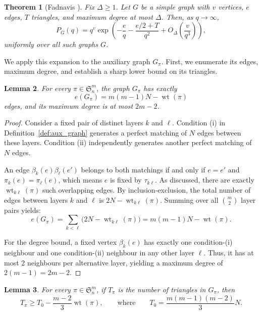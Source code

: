 \documentclass[11pt,reqno]{amsart}
\newtheorem{theorem}{Theorem}[section]
\newtheorem{lemma}[theorem]{Lemma}
\theoremstyle{definition}
\theoremstyle{remark}
\renewcommand\geq{\geqslant}
\renewcommand\to{\rightarrow}
\newcommand{\wt}{\operatorname{wt}}
\begin{document}
\begin{theorem}[Fadnavis \cite{Fadnavis}]\label{thm:fadnavis_expansion}
Fix $\Delta\geq1$. Let $G$ be a simple graph with $v$ vertices, $e$ edges, $T$ triangles, and maximum degree at most $\Delta$. Then, as $q\to\infty$,
\begin{equation}\label{eq:chromatic_formula}
        P_G(q)=q^v\exp\left( -\frac eq-\frac{e/2+T}{q^2}+O_\Delta\left(\frac v{q^3}\right) \right),
\end{equation}
uniformly over all such graphs $G$.
\end{theorem}

We apply this expansion to the auxiliary graph $G_\pi$. First, we enumerate its edges, maximum degree, and establish a sharp lower bound on its triangles.

\begin{lemma}\label{lem:aux_basic}
For every $\pi\in\mathfrak S_n^m$, the graph $G_\pi$ has exactly 
$$e(G_\pi)=m(m-1)N-\wt(\pi)$$
edges, and its maximum degree is at most $2m-2$.
\end{lemma}

\begin{proof}
Consider a fixed pair of distinct layers $k$ and $\ell$. Condition \textup{(i)} in Definition~\ref{def:aux_graph} generates a perfect matching of $N$ edges between these layers. Condition \textup{(ii)} independently generates another perfect matching of $N$ edges. 

An edge $\beta_k(e)\beta_\ell(e')$ belongs to both matchings if and only if $e=e'$ and $\pi_k(e)=\pi_\ell(e)$, which means $e$ is fixed by $\tau_{k\ell}$. As discussed, there are exactly $\wt_{k\ell}(\pi)$ such overlapping edges. By inclusion-exclusion, the total number of edges between layers $k$ and $\ell$ is $2N-\wt_{k\ell}(\pi)$. Summing over all $\binom m2$ layer pairs yields:
\[
        e(G_\pi)=\sum_{k<\ell}\bigl(2N-\wt_{k\ell}(\pi)\bigr) =m(m-1)N-\wt(\pi).
\]

For the degree bound, a fixed vertex $\beta_k(e)$ has exactly one condition-\textup{(i)} neighbour and one condition-\textup{(ii)} neighbour in any other layer $\ell$. Thus, it has at most 2 neighbours per alternative layer, yielding a maximum degree of $2(m-1) = 2m-2$.
\end{proof}

\begin{lemma}\label{lem:triangle_bound}
For every $\pi\in\mathfrak S_n^m$, if $T_\pi$ is the number of triangles in $G_\pi$, then
\begin{equation}\label{eq:triangle_lower_bound}
T_\pi\geq T_0-\frac{m-2}{3}\wt(\pi), \qquad\text{where}\qquad T_0=\frac{m(m-1)(m-2)}3N.
\end{equation}
\end{lemma}
\end{document}
